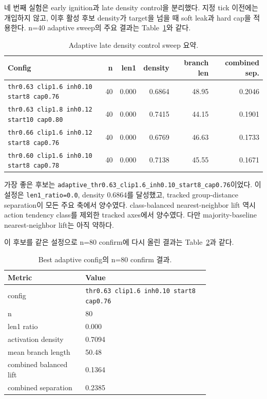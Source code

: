 \documentclass[11pt,a4paper]{article}
\begin{document}
네 번째 실험은 early ignition과 late density control을 분리했다. 지정 tick 이전에는 개입하지 않고, 이후 활성 후보 density가 target을 넘을 때 soft leak과 hard cap을 적용한다. n=40 adaptive sweep의 주요 결과는 Table~\ref{tab:adaptive}와 같다.

\begin{table}[h]
\centering
\small
\begin{tabular}{lrrrrr}
\toprule
Config & n & len1 & density & branch len & combined sep. \\
\midrule
\texttt{thr0.63 clip1.6 inh0.10 start8 cap0.76} & 40 & 0.000 & 0.6864 & 48.95 & 0.2046 \\
\texttt{thr0.63 clip1.8 inh0.12 start10 cap0.80} & 40 & 0.000 & 0.7415 & 44.15 & 0.1901 \\
\texttt{thr0.66 clip1.6 inh0.12 start8 cap0.76} & 40 & 0.000 & 0.6769 & 46.63 & 0.1733 \\
\texttt{thr0.60 clip1.6 inh0.10 start8 cap0.78} & 40 & 0.000 & 0.7138 & 45.55 & 0.1671 \\
\bottomrule
\end{tabular}
\caption{Adaptive late density control sweep 요약.}
\label{tab:adaptive}
\end{table}

가장 좋은 후보는 \texttt{adaptive\_thr0.63\_clip1.6\_inh0.10\_start8\_cap0.76}이었다. 이 설정은 \texttt{len1\_ratio=0.0}, density 0.6864를 달성했고, tracked group-distance separation이 모든 주요 축에서 양수였다. class-balanced nearest-neighbor lift 역시 action tendency class를 제외한 tracked axes에서 양수였다. 다만 majority-baseline nearest-neighbor lift는 아직 약하다.

이 후보를 같은 설정으로 n=80 confirm에 다시 올린 결과는 Table~\ref{tab:adaptive-confirm}과 같다.

\begin{table}[h]
\centering
\small
\begin{tabular}{p{0.30\linewidth}p{0.48\linewidth}}
\toprule
Metric & Value \\
\midrule
config & \texttt{thr0.63 clip1.6 inh0.10 start8 cap0.76} \\
n & 80 \\
len1 ratio & 0.000 \\
activation density & 0.7094 \\
mean branch length & 50.48 \\
combined balanced lift & 0.1364 \\
combined separation & 0.2385 \\
\bottomrule
\end{tabular}
\caption{Best adaptive config의 n=80 confirm 결과.}
\label{tab:adaptive-confirm}
\end{table}
\end{document}
